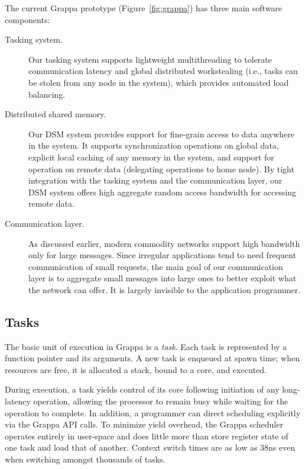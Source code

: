 The current Grappa prototype (Figure~\ref{fig:grappa}) has three main software components: 
\begin{description}

\item [Tasking system.] Our tasking system supports lightweight multithreading to tolerate communication latency and global distributed workstealing (i.e., tasks can be stolen from any node in the system), which provides automated load balancing.

\item[Distributed shared memory.] Our DSM system provides support for fine-grain access to data anywhere in the system. It supports synchronization operations on global data, explicit local caching of any memory in the system, and support for operation on remote data (delegating operations to home node). By tight integration with the tasking system and the communication layer, our DSM system offers high aggregate random access bandwidth for accessing remote data.

\item[Communication layer.] As discussed earlier, modern commodity networks support high bandwidth only for large messages. Since irregular applications tend to need frequent communication of small requests, the main goal of our communication layer is to aggregate small messages into large ones to better exploit what the network can offer. It is largely invisible to the application programmer.

\end{description}

\subsection{Tasks}

The basic unit of execution in Grappa is a {\em task}. Each task is represented by a function pointer and its arguments. A new task is enqueued at spawn time; when resources are free, it is allocated a stack, bound to a core, and executed.

During execution, a task yields control of its core following initiation of any long-latency operation, allowing the processor to remain busy while waiting for the operation to complete.  In addition,  a programmer can direct scheduling explicitly via the Grappa API calls. To minimize yield overhead, the Grappa scheduler operates entirely in user-space and does little more than store register state of one task and load that of another. Context switch times are as low as 38ns even when switching amongst thousands of tasks.

